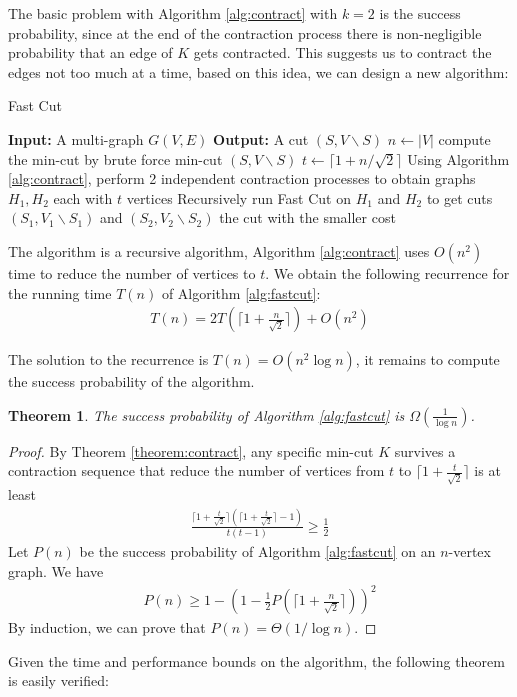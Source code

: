 \documentclass[11pt]{article}
\theoremstyle{plain}
\newtheorem{theorem}{Theorem}[section]
\begin{document}
The basic problem with Algorithm \ref{alg:contract} with $k=2$ is the success probability, since at the end of the contraction process there is non-negligible probability that an edge of $K$ gets contracted. This suggests us to contract the edges not too much at a time, based on this idea, we can design a new algorithm:

\begin{algorithm}
\caption{Fast Cut}
\label{alg:fastcut}
\begin{algorithmic}[1]
    \STATE \textbf{Input:} A multi-graph $G(V,E)$
    \STATE \textbf{Output:} A cut $(S,V\backslash S)$
    \STATE $n\leftarrow |V|$
    \STATE compute the min-cut by brute force
    \RETURN min-cut $(S,V\backslash S)$
    \ELSE
    \STATE $t\leftarrow \lceil 1+n/\sqrt{2}\rceil$
    \STATE Using Algorithm \ref{alg:contract}, perform 2 independent contraction processes to obtain graphs $H_1,H_2$ each with $t$ vertices
    \STATE Recursively run Fast Cut on $H_1$ and $H_2$ to get cuts $(S_1,V_1\backslash S_1)$ and $(S_2,V_2\backslash S_2)$
    \RETURN the cut with the smaller cost
    \ENDIF
\end{algorithmic}
\end{algorithm}

The algorithm is a recursive algorithm, Algorithm \ref{alg:contract} uses $O(n^2)$ time to reduce the number of vertices to $t$. We obtain the following recurrence for the running time $T(n)$ of Algorithm \ref{alg:fastcut}:
\begin{align*}
    T(n)=2T\left(\lceil 1+\frac{n}{\sqrt{2}}\rceil\right)+O(n^2)
\end{align*}

The solution to the recurrence is $T(n)=O(n^2\log n)$, it remains to compute the success probability of the algorithm. 

\begin{theorem}
    The success probability of Algorithm \ref{alg:fastcut} is $\Omega(\frac{1}{\log n})$.
\end{theorem}
\begin{proof}
    By Theorem \ref{theorem:contract}, any specific min-cut $K$ survives a contraction sequence that reduce the number of vertices from $t$ to $\lceil 1+\frac{t}{\sqrt{2}}\rceil$ is at least
    \begin{align*}
        \frac{\lceil 1+\frac{t}{\sqrt{2}}\rceil(\lceil 1+\frac{t}{\sqrt{2}}\rceil-1)}{t(t-1)}\geq \frac{1}{2}
    \end{align*}
    Let $P(n)$ be the success probability of Algorithm \ref{alg:fastcut} on an $n$-vertex graph. We have
    \begin{align*}
        P(n)\geq 1-\left(1-\frac{1}{2}P\left(\lceil 1+\frac{n}{\sqrt{2}}\rceil\right)\right)^2
    \end{align*}
    By induction, we can prove that $P(n)=\Theta(1/\log n)$.
\end{proof}
Given the time and performance bounds on the algorithm, the following theorem is easily verified:
\end{document}
